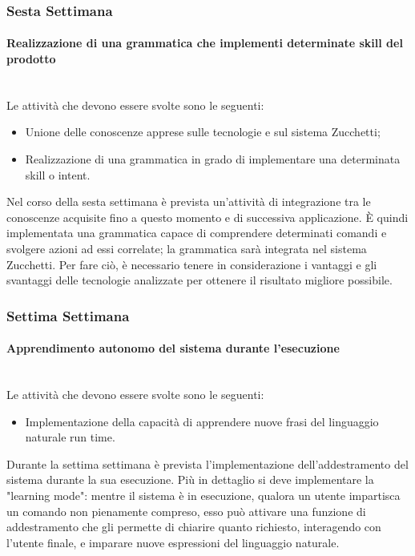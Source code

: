 {     \subsubsection{Sesta Settimana}
     	\paragraph*{Realizzazione di una grammatica che implementi determinate skill del prodotto} \mbox{}\\ [1mm]
    	Le attività che devono essere svolte sono le seguenti:
        \begin{itemize}
            \item Unione delle conoscenze apprese sulle tecnologie e sul sistema Zucchetti;
            \item Realizzazione di una grammatica in grado di implementare una determinata skill o intent.
        \end{itemize}
    	Nel corso della sesta settimana è prevista un'attività di integrazione tra le conoscenze acquisite fino a questo momento e di successiva applicazione. È quindi  implementata una grammatica capace di comprendere determinati comandi e svolgere azioni ad essi correlate; la grammatica sarà integrata nel sistema Zucchetti. Per fare ciò, è necessario tenere in considerazione i vantaggi e gli svantaggi delle tecnologie analizzate per ottenere il risultato migliore possibile.
    \subsubsection{Settima Settimana}
    	\paragraph*{Apprendimento autonomo del sistema durante l'esecuzione} \mbox{}\\ [1mm]
    	Le attività che devono essere svolte sono le seguenti:
        \begin{itemize}
            \item Implementazione della capacità di apprendere nuove frasi del linguaggio naturale run time.
        \end{itemize}
    	Durante la settima settimana è prevista l'implementazione dell'addestramento del sistema durante la sua esecuzione. Più in dettaglio si deve implementare la "learning mode": mentre il sistema è in esecuzione, qualora un utente impartisca un comando non pienamente compreso, esso può attivare una funzione di addestramento che gli permette di chiarire quanto richiesto, interagendo con l'utente finale, e imparare nuove espressioni del linguaggio naturale. 
}

